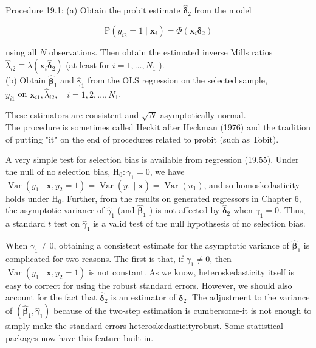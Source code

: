 \documentclass[10pt]{article}
\begin{document}
Procedure 19.1: (a) Obtain the probit estimate $\hat{\boldsymbol{\delta}}_{2}$ from the model


\begin{equation*}
\mathrm{P}\left(y_{i 2}=1 \mid \mathbf{x}_{i}\right)=\Phi\left(\mathbf{x}_{i} \boldsymbol{\delta}_{2}\right) \tag{19.54}
\end{equation*}


using all $N$ observations. Then obtain the estimated inverse Mills ratios $\hat{\lambda}_{i 2} \equiv \lambda\left(\mathbf{x}_{i} \hat{\boldsymbol{\delta}}_{2}\right)$ (at least for $i=1, \ldots, N_{1}$ ).\\
(b) Obtain $\hat{\boldsymbol{\beta}}_{1}$ and $\hat{\gamma}_{1}$ from the OLS regression on the selected sample,\\
$y_{i 1}$ on $\mathbf{x}_{i 1}, \hat{\lambda}_{i 2}, \quad i=1,2, \ldots, N_{1}$.

These estimators are consistent and $\sqrt{N}$-asymptotically normal.\\
The procedure is sometimes called Heckit after Heckman (1976) and the tradition of putting "it" on the end of procedures related to probit (such as Tobit).

A very simple test for selection bias is available from regression (19.55). Under the null of no selection bias, $\mathrm{H}_{0}: \gamma_{1}=0$, we have $\operatorname{Var}\left(y_{1} \mid \mathbf{x}, y_{2}=1\right)=\operatorname{Var}\left(y_{1} \mid \mathbf{x}\right)= \operatorname{Var}\left(u_{1}\right)$, and so homoskedasticity holds under $\mathrm{H}_{0}$. Further, from the results on generated regressors in Chapter 6, the asymptotic variance of $\hat{\gamma}_{1}$ (and $\hat{\boldsymbol{\beta}}_{1}$ ) is not affected by $\hat{\boldsymbol{\delta}}_{2}$ when $\gamma_{1}=0$. Thus, a standard $t$ test on $\hat{\gamma}_{1}$ is a valid test of the null hypothsesis of no selection bias.

When $\gamma_{1} \neq 0$, obtaining a consistent estimate for the asymptotic variance of $\hat{\boldsymbol{\beta}}_{1}$ is complicated for two reasons. The first is that, if $\gamma_{1} \neq 0$, then $\operatorname{Var}\left(y_{1} \mid \mathbf{x}, y_{2}=1\right)$ is not constant. As we know, heteroskedasticity itself is easy to correct for using the robust standard errors. However, we should also account for the fact that $\hat{\boldsymbol{\delta}}_{2}$ is an estimator of $\boldsymbol{\delta}_{2}$. The adjustment to the variance of $\left(\hat{\boldsymbol{\beta}}_{1}, \hat{\gamma}_{1}\right)$ because of the two-step estimation is cumbersome-it is not enough to simply make the standard errors heteroskedasticityrobust. Some statistical packages now have this feature built in.
\end{document}
